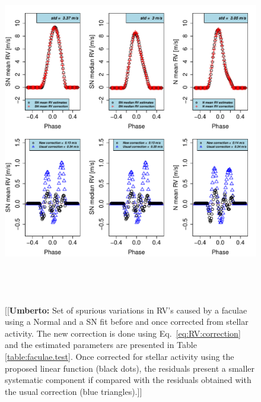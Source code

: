 \documentclass{aa}
\newcommand{\umberto}[1]{{\color{green}[[\textbf{Umberto: }#1]]}}
\begin{document}
\begin{figure}[htbp]
   \centering
\includegraphics[height = 6in]{FACULAE_NEW_CORRECTION_[3]CorrectionActivity_RadialVelocity_vs_time.pdf} 
   \caption{\umberto{Set of spurious variations in RV's caused by a faculae using a Normal and a SN fit before and once corrected from stellar activity. The new correction is done using Eq.~\ref{eq:RV:correction} and the estimated parameters are presented in Table \ref{table:faculae.test}. Once corrected for stellar activity using the proposed linear function (black dots), the residuals present a smaller systematic component if compared with the residuals obtained with the usual correction (blue triangles).}}
    \label{fig:faculae.correction}
\end{figure}
\end{document}
